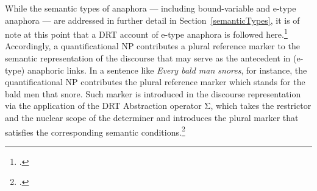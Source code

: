 \documentclass[output=paper
,modfonts
,nonflat]{langsci/langscibook}
\begin{document}
While the semantic types of anaphora --- including bound-variable and e-type anaphora --- are addressed in further detail in Section~\ref{semanticTypes},
it is of note at this point that a DRT account of e-type anaphora is followed here.\footnote{
\citep[\page 311ff]{kamp:drt93}.} 
Accordingly, a quantificational NP contributes a plural reference marker to the
semantic representation of the discourse that may serve as the antecedent in (e-type) 
anaphoric links. In a sentence like {\em Every bald man snores}, for instance,
the quantificational NP contributes 
the plural reference marker which stands for the bald
men that snore. Such marker is introduced in the discourse representation
via the application of the DRT Abstraction operator Σ, which
takes the restrictor and the nuclear scope of the determiner and
introduces the plural marker that satisfies the corresponding
semantic conditions.\footnote{
\citep[]{kamp:drt93}.}
\end{document}
